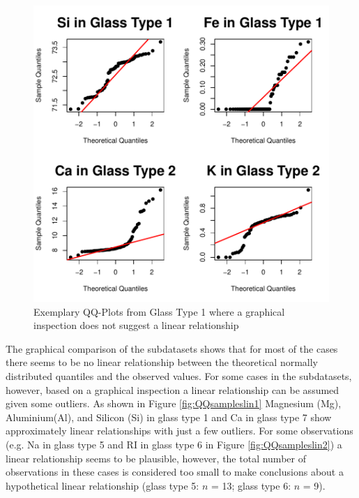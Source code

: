 \documentclass[a4paper, 12pt, titlepage, headsepline, listof = totoc, bibliography = totoc, numbers = noenddot]{scrartcl}
\begin{document}
\begin{figure}[h!]
\centering
\includegraphics[width=\textwidth]{report-QQsamples}
\caption{Exemplary QQ-Plots from Glass Type 1 where a graphical inspection does not suggest a linear relationship}
\label{fig:QQsamples}
\end{figure}

The graphical comparison of the subdatasets shows that for most of the cases there seems to be no linear relationship between the theoretical normally distributed quantiles and the observed values. For some cases in the subdatasets, however, based on a graphical inspection a linear relationship can be assumed given some outliers. As shown in Figure \ref{fig:QQsampleslin1} Magnesium (Mg), Aluminium(Al), and Silicon (Si) in glass type 1 and Ca in glass type 7 show approximately linear relationships with just a few outliers. For some observations (e.g. Na in glass type 5 and RI in glass type 6 in Figure \ref{fig:QQsampleslin2}) a linear relationship seems to be plausible, however, the total number of observations in these cases is considered too small to make conclusions about a hypothetical linear relationship (glass type 5: $n$ = 13; glass type 6: $n$ = 9).
\end{document}
